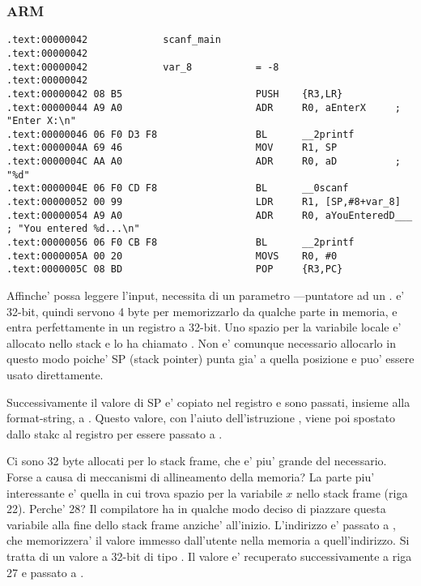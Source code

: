 \subsubsection{ARM}

\myparagraph{\OptimizingKeilVI (\ThumbMode)}

\begin{lstlisting}
.text:00000042             scanf_main
.text:00000042
.text:00000042             var_8           = -8
.text:00000042
.text:00000042 08 B5                       PUSH    {R3,LR}
.text:00000044 A9 A0                       ADR     R0, aEnterX     ; "Enter X:\n"
.text:00000046 06 F0 D3 F8                 BL      __2printf
.text:0000004A 69 46                       MOV     R1, SP
.text:0000004C AA A0                       ADR     R0, aD          ; "%d"
.text:0000004E 06 F0 CD F8                 BL      __0scanf
.text:00000052 00 99                       LDR     R1, [SP,#8+var_8]
.text:00000054 A9 A0                       ADR     R0, aYouEnteredD___ ; "You entered %d...\n"
.text:00000056 06 F0 CB F8                 BL      __2printf
.text:0000005A 00 20                       MOVS    R0, #0
.text:0000005C 08 BD                       POP     {R3,PC}
\end{lstlisting}

\myindex{\CLanguageElements!\Pointers}

Affinche' \scanf possa leggere l'input, necessita di un parametro ---puntatore ad un \Tint.
\Tint e' 32-bit, quindi servono 4 byte per memorizzarlo da qualche parte in memoria, e entra perfettamente in un registro a 32-bit.
Uno spazio per la variabile locale  e' allocato nello stack e \IDA
lo ha chiamato . Non e' comunque necessario allocarlo in questo modo poiche' \ac{SP} (\gls{stack pointer}) punta gia' a quella posizione e puo' essere usato direttamente.

Successivamente il valore di \ac{SP} e' copiato nel registro  e sono passati, insieme alla format-string, a \scanf.
Questo valore, con l'aiuto dell'istruzione  , viene poi spostato dallo stakc al registro  per essere passato a \printf.




Ci sono 32 byte allocati per lo stack frame, che e' piu' grande del necessario. Forse a causa di meccanismi di allineamento della memoria?
La parte piu' interessante e' quella in cui trova spazio per la variabile $x$ nello stack frame (riga 22).
Perche' 28? Il compilatore ha in qualche modo deciso di piazzare questa variabile alla fine dello stack frame anziche' all'inizio.
L'indirizzo e' passato a \scanf, che memorizzera' il valore immesso dall'utente nella memoria a quell'indirizzo.
Si tratta di un valore a 32-bit di tipo \Tint.
Il valore e' recuperato successivamente a riga 27 e passato a \printf.

